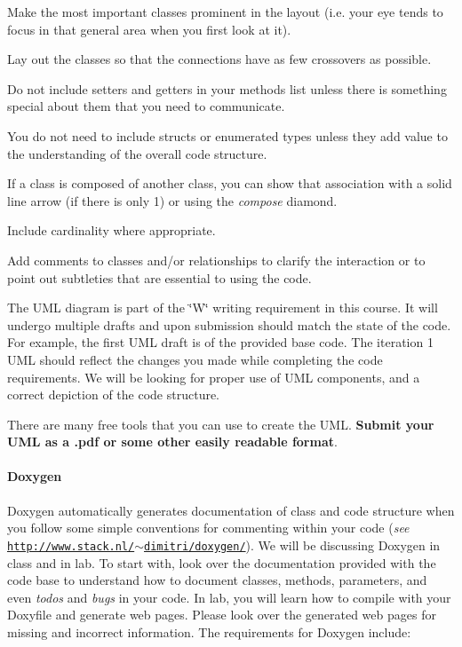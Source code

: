 \begin{DoxyItemize}
\item Make the most important classes prominent in the layout (i.\+e. your eye tends to focus in that general area when you first look at it).
\item Lay out the classes so that the connections have as few crossovers as possible.
\item Do not include setters and getters in your methods list unless there is something special about them that you need to communicate.
\item You do not need to include structs or enumerated types unless they add value to the understanding of the overall code structure.
\item If a class is composed of another class, you can show that association with a solid line arrow (if there is only 1) or using the {\itshape compose} diamond.
\item Include cardinality where appropriate.
\item Add comments to classes and/or relationships to clarify the interaction or to point out subtleties that are essential to using the code.
\end{DoxyItemize}

The U\+ML diagram is part of the \char`\"{}\+W\char`\"{} writing requirement in this course. It will undergo multiple drafts and upon submission should match the state of the code. For example, the first U\+ML draft is of the provided base code. The iteration 1 U\+ML should reflect the changes you made while completing the code requirements. We will be looking for proper use of U\+ML components, and a correct depiction of the code structure.

There are many free tools that you can use to create the U\+ML. {\bfseries Submit your U\+ML as a .pdf or some other easily readable format}.

\paragraph*{Doxygen}

Doxygen automatically generates documentation of class and code structure when you follow some simple conventions for commenting within your code ({\itshape see} \href{http://www.stack.nl/~dimitri/doxygen/}{\tt http\+://www.\+stack.\+nl/$\sim$dimitri/doxygen/}). We will be discussing Doxygen in class and in lab. To start with, look over the documentation provided with the code base to understand how to document classes, methods, parameters, and even {\itshape todo\textquotesingle{}s} and {\itshape bugs} in your code. In lab, you will learn how to compile with your Doxyfile and generate web pages. Please look over the generated web pages for missing and incorrect information. The requirements for Doxygen include\+:


